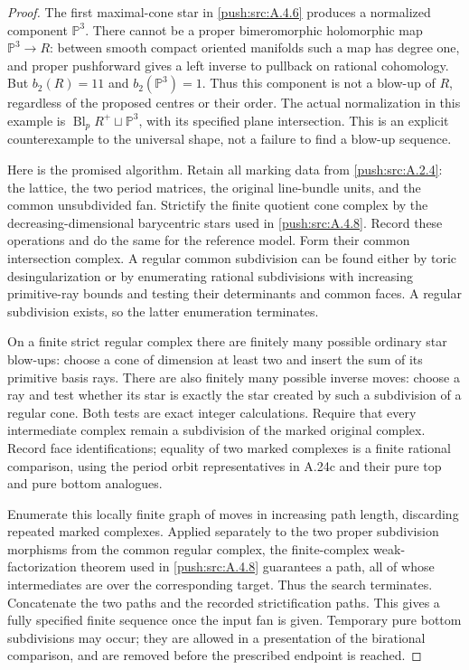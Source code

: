 \begin{proof}
The first maximal-cone star in \ref{push:src:A.4.6} produces a normalized
component $\mathbb P^3$. There cannot be a proper
bimeromorphic holomorphic map $\mathbb P^3\to R$:
between smooth compact oriented manifolds such a map
has degree one, and proper pushforward gives a left
inverse to pullback on rational cohomology. But
$b_2(R)=11$ and $b_2(\mathbb P^3)=1$.
Thus this component is not a blow-up of $R$, regardless
of the proposed centres or their order. The actual
normalization in this example is
$\operatorname{Bl}_pR^+\sqcup\mathbb P^3$,
with its specified plane intersection. This is an
explicit counterexample to the universal shape, not
a failure to find a blow-up sequence.

Here is the promised algorithm. Retain all marking
data from \ref{push:src:A.2.4}: the lattice, the two period matrices,
the original line-bundle units, and the common
unsubdivided fan. Strictify the finite quotient cone
complex by the decreasing-dimensional barycentric
stars used in \ref{push:src:A.4.8}. Record these operations and do
the same for the reference model. Form their common
intersection complex. A regular common subdivision
can be found either by toric desingularization or by
enumerating rational subdivisions with increasing
primitive-ray bounds and testing their determinants
and common faces. A regular subdivision exists, so
the latter enumeration terminates.

On a finite strict regular complex there are finitely
many possible ordinary star blow-ups: choose a cone
of dimension at least two and insert the sum of its
primitive basis rays. There are also finitely many
possible inverse moves: choose a ray and test whether
its star is exactly the star created by such a
subdivision of a regular cone. Both tests are exact
integer calculations. Require that every intermediate
complex remain a subdivision of the marked original
complex. Record face identifications; equality of two
marked complexes is a finite rational comparison,
using the period orbit representatives in A.24c and
their pure top and pure bottom analogues.

Enumerate this locally finite graph of moves in
increasing path length, discarding repeated marked
complexes. Applied separately to the two proper
subdivision morphisms from the common regular
complex, the finite-complex weak-factorization theorem
used in \ref{push:src:A.4.8} guarantees a path, all of whose
intermediates are over the corresponding target.
Thus the search terminates. Concatenate the two paths
and the recorded strictification paths. This gives a
fully specified finite sequence once the input fan is
given. Temporary pure bottom subdivisions may occur;
they are allowed in a presentation of the birational
comparison, and are removed before the prescribed
endpoint is reached.


\end{proof}
